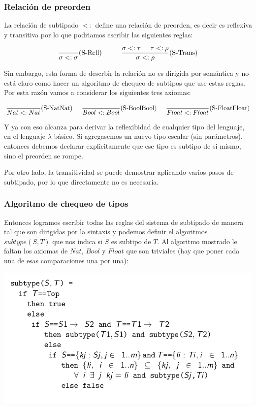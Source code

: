 \subsubsection{Relación de preorden} La relación de subtipado $<:$ define una relación de preorden, es decir es reflexiva y transitiva por lo que podriamos escribir las siguientes reglas:

$$\frac{}{\sigma <: \sigma}(\text{S-Refl}) \hspace*{1cm}\frac{\sigma <:\tau\hspace*{5mm}\tau <: \rho}{\sigma <: \rho}(\text{S-Trans})$$

Sin embargo, esta forma de descrbir la relación no es dirigida por semántica y no está claro como hacer un algoritmo de chequeo de subtipos que use estas reglas. Por esta razón vamos a considerar los siguientes tres axiomas:

\begin{align*}
\frac{}{Nat <: Nat}(\text{S-NatNat}) \hspace*{5mm}\frac{}{Bool <: Bool}(\text{S-BoolBool}) \hspace*{5mm}\frac{}{Float <: Float}(\text{S-FloatFloat})
\end{align*}

\vspace*{5mm}
Y ya con eso alcanza para derivar la reflexibidad de cualquier tipo del lenguaje, en el lenguaje $\lambda$ básico. Si agregasemos un nuevo tipo escalar (sin parámetros), entonces debemos declarar explicitamente que ese tipo es subtipo de si mismo, sino el preorden se rompe.

Por otro lado, la transitividad se puede demostrar aplicando varios pasos de subtipado, por lo que directamente no es necesaria.

\subsubsection{Algoritmo de chequeo de tipos}
Entonces logramos escribir todas las reglas del sistema de subtipado de manera tal que son dirigidas por la sintaxis y podemos definir el algoritmos $subtype(S,T)$ que nos indica si $S$ es subtipo de $T$. Al algoritmo mostrado le faltan los axiomas de $Nat$, $Bool$ y $Float$ que son triviales (hay que poner cada una de esas comparaciones una por una):

\includegraphics[scale=0.4]{imagenes/algoritmo_subtipado.png}

